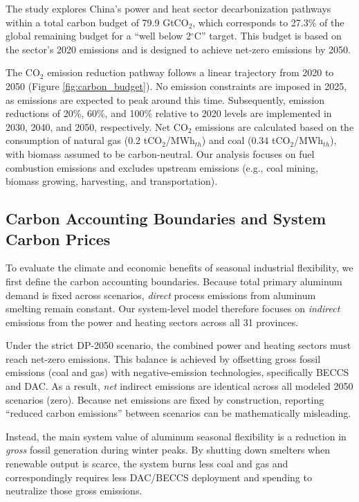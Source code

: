 \documentclass[preprint,12pt]{elsarticle}
\begin{document}
The study explores China's power and heat sector decarbonization pathways within a total carbon budget of 79.9 GtCO$_2$, which corresponds to 27.3\% of the global remaining budget for a ``well below 2$^{\circ}$C'' target. This budget is based on the sector's 2020 emissions and is designed to achieve net-zero emissions by 2050.

The CO$_2$ emission reduction pathway follows a linear trajectory from 2020 to 2050 (Figure \ref{fig:carbon_budget}). No emission constraints are imposed in 2025, as emissions are expected to peak around this time. Subsequently, emission reductions of 20\%, 60\%, and 100\% relative to 2020 levels are implemented in 2030, 2040, and 2050, respectively. Net CO$_2$ emissions are calculated based on the consumption of natural gas (0.2 tCO$_2$/MWh$_{th}$) and coal (0.34 tCO$_2$/MWh$_{th}$), with biomass assumed to be carbon-neutral. Our analysis focuses on fuel combustion emissions and excludes upstream emissions (e.g., coal mining, biomass growing, harvesting, and transportation).


\subsection{Carbon Accounting Boundaries and System Carbon Prices}\label{sec:carbon_boundaries}

To evaluate the climate and economic benefits of seasonal industrial flexibility, we first define the carbon accounting boundaries. Because total primary aluminum demand is fixed across scenarios, \textit{direct} process emissions from aluminum smelting remain constant. Our system-level model therefore focuses on \textit{indirect} emissions from the power and heating sectors across all 31 provinces.

Under the strict DP-2050 scenario, the combined power and heating sectors must reach net-zero emissions. This balance is achieved by offsetting gross fossil emissions (coal and gas) with negative-emission technologies, specifically BECCS and DAC. As a result, \textit{net} indirect emissions are identical across all modeled 2050 scenarios (zero). Because net emissions are fixed by construction, reporting ``reduced carbon emissions'' between scenarios can be mathematically misleading.

Instead, the main system value of aluminum seasonal flexibility is a reduction in \textit{gross} fossil generation during winter peaks. By shutting down smelters when renewable output is scarce, the system burns less coal and gas and correspondingly requires less DAC/BECCS deployment and spending to neutralize those gross emissions.
\end{document}
